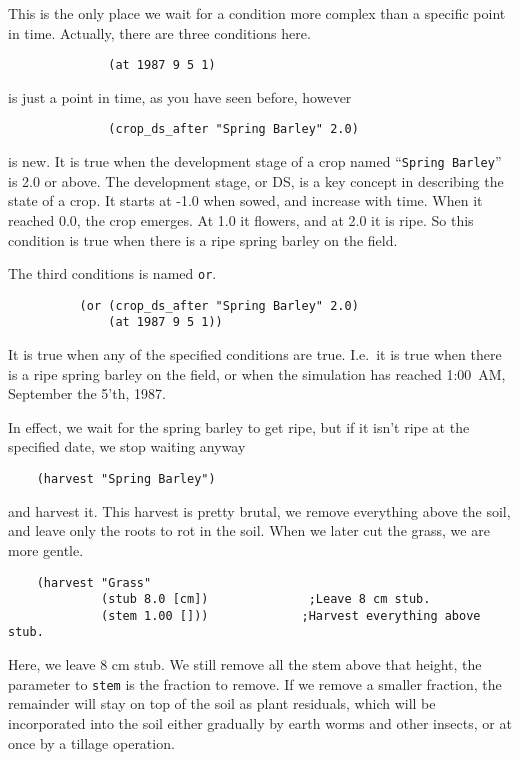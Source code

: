 \documentclass[a4paper,11pt]{article}
\begin{document}
This is the only place we wait for a condition more complex than a
specific point in time.  Actually, there are three conditions here.

\begin{verbatim}
              (at 1987 9 5 1)
\end{verbatim}

is just a point in time, as you have seen before, however

\begin{verbatim}
              (crop_ds_after "Spring Barley" 2.0)
\end{verbatim}

is new.  It is true when the development stage of a crop named
``\texttt{Spring Barley}'' is 2.0 or above.  The development stage, or
DS, is a key concept in describing the state of a crop.  It starts at
-1.0 when sowed, and increase with time.  When it reached 0.0, the
crop emerges.  At 1.0 it flowers, and at 2.0 it is ripe.   So this
condition is true when there is a ripe spring barley on the field.

The third conditions is named \texttt{or}.

\begin{verbatim}
          (or (crop_ds_after "Spring Barley" 2.0)
              (at 1987 9 5 1))
\end{verbatim}

It is true when any of the specified conditions are true.  I.e.\ it is
true when there is a ripe spring barley on the field, or when the
simulation has reached 1:00~AM, September the 5'th, 1987.

In effect, we wait for the spring barley to get ripe, but if it isn't
ripe at the specified date, we stop waiting anyway

\begin{verbatim}
    (harvest "Spring Barley")
\end{verbatim}

and harvest it.  This harvest is pretty brutal, we remove everything
above the soil, and leave only the roots to rot in the soil.  When we
later cut the grass, we are more gentle.

\begin{verbatim}
    (harvest "Grass"
             (stub 8.0 [cm])              ;Leave 8 cm stub.
             (stem 1.00 []))             ;Harvest everything above stub.
\end{verbatim}

Here, we leave 8 cm stub.  We still remove all the stem above that
height, the parameter to \texttt{stem} is the fraction to remove.  If
we remove a smaller fraction, the remainder will stay on top of the
soil as plant residuals, which will be incorporated into the soil
either gradually by earth worms and other insects, or at once by a
tillage operation.
\end{document}
